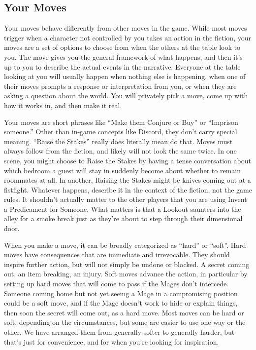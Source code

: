 \documentclass[
]{article}
\begin{document}
\hypertarget{your-moves}{%
\subsection{Your Moves}\label{your-moves}}

Your moves behave differently from other moves in the game. While most
moves trigger when a character not controlled by you takes an action in
the fiction, your moves are a set of options to choose from when the
others at the table look to you. The move gives you the general
framework of what happens, and then it's up to you to describe the
actual events in the narrative. Everyone at the table looking at you
will usually happen when nothing else is happening, when one of their
moves prompts a response or interpretation from you, or when they are
asking a question about the world. You will privately pick a move, come
up with how it works in, and then make it real.

Your moves are short phrases like ``Make them Conjure or Buy'' or
``Imprison someone.'' Other than in-game concepts like Discord, they
don't carry special meaning. ``Raise the Stakes'' really does literally
mean do that. Moves must always follow from the fiction, and likely will
not look the same twice. In one scene, you might choose to Raise the
Stakes by having a tense conversation about which bedroom a guest will
stay in suddenly become about whether to remain roommates at all. In
another, Raising the Stakes might be knives coming out at a fistfight.
Whatever happens, describe it in the context of the fiction, not the
game rules. It shouldn't actually matter to the other players that you
are using Invent a Predicament for Someone. What matters is that a
Lookout saunters into the alley for a smoke break just as they're about
to step through their dimensional door.

When you make a move, it can be broadly categorized as ``hard'' or
``soft''. Hard moves have consequences that are immediate and
irrevocable. They should inspire further action, but will not simply be
undone or blocked. A secret coming out, an item breaking, an injury.
Soft moves advance the action, in particular by setting up hard moves
that will come to pass if the Mages don't intercede. Someone coming home
but not yet seeing a Mage in a compromising position could be a soft
move, and if the Mage doesn't work to hide or explain things, then soon
the secret will come out, as a hard move. Most moves can be hard or
soft, depending on the circumstances, but some are easier to use one way
or the other. We have arranged them from generally softer to generally
harder, but that's just for convenience, and for when you're looking for
inspiration.
\end{document}
